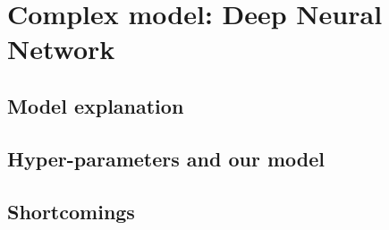 \section{Complex model: Deep Neural Network}
\subsection{Model explanation}
\subsection{Hyper-parameters and our model}
\subsection{Shortcomings}
